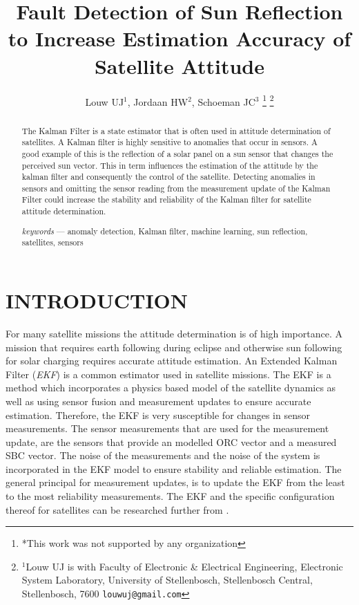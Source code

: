 \documentclass[letterpaper, 10 pt, conference]{ieeeconf}  %
\title{\LARGE \bf
Fault Detection of Sun Reflection to Increase Estimation Accuracy of Satellite Attitude
}
\author{Louw UJ$^{1}$, Jordaan HW$^{2}$, Schoeman JC$^{3}$%
\thanks{*This work was not supported by any organization}%
\thanks{$^{1}$Louw UJ is with Faculty of Electronic \& Electrical Engineering, Electronic System            Laboratory, University of Stellenbosch, Stellenbosch Central, Stellenbosch, 7600
        {\tt\small louwuj@gmail.com}}%
}
\begin{document}
\maketitle
\thispagestyle{empty}
\pagestyle{empty}


\begin{abstract}

The Kalman Filter is a state estimator that is often used in attitude determination of satellites. A Kalman filter is highly sensitive to anomalies that occur in sensors. A good example of this is the reflection of a solar panel on a sun sensor that changes the perceived sun vector. This in term influences the estimation of the attitude by the kalman filter and consequently the control of the satellite. Detecting anomalies in sensors and omitting the sensor reading from the measurement update of the Kalman Filter could increase the stability and reliability of the Kalman filter for satellite attitude determination.

\emph{keywords} --- anomaly detection, Kalman filter, machine learning, sun reflection, satellites, sensors

\end{abstract}


\section{INTRODUCTION}
For many satellite missions the attitude determination is of high importance. A mission that requires earth following during eclipse and otherwise sun following for solar charging requires accurate attitude estimation. An Extended Kalman Filter (\emph{EKF}) is a common estimator used in satellite missions. The EKF is a method which incorporates a physics based model of the satellite dynamics as well as using sensor fusion and measurement updates to ensure accurate estimation. Therefore, the EKF is very susceptible for changes in sensor measurements. The sensor measurements that are used for the measurement update, are the sensors that provide an modelled ORC vector and a measured SBC vector. The noise of the measurements and the noise of the system is incorporated in the EKF model to ensure stability and reliable estimation. The general principal for measurement updates, is to update the EKF from the least to the most reliability measurements. The EKF and the specific configuration thereof for satellites can be researched further from \textcite{JansevanVuuren2015}. 
\end{document}
